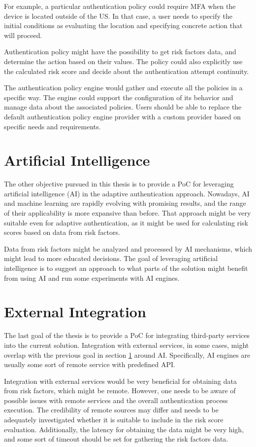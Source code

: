 For example, a particular authentication policy could require MFA when the device is located outside of the US.
In that case, a user needs to specify the initial conditions as evaluating the location and specifying concrete action that will proceed.

Authentication policy might have the possibility to get risk factors data, and determine the action based on their values.
The policy could also explicitly use the calculated risk score and decide about the authentication attempt continuity.

The authentication policy engine would gather and execute all the policies in a specific way.
The engine could support the configuration of its behavior and manage data about the associated policies.
Users should be able to replace the default authentication policy engine provider with a custom provider based on specific needs and requirements.

\section{Artificial Intelligence}\label{spec-ai}
The other objective pursued in this thesis is to provide a PoC for leveraging artificial intelligence (AI) in the adaptive authentication approach.
Nowadays, AI and machine learning are rapidly evolving with promising results, and the range of their applicability is more expansive than before.
That approach might be very suitable even for adaptive authentication, as it might be used for calculating risk scores based on data from risk factors.

Data from risk factors might be analyzed and processed by AI mechanisms, which might lead to more educated decisions.
The goal of leveraging artificial intelligence is to suggest an approach to what parts of the solution might benefit from using AI and run some experiments with AI engines.

\section{External Integration}
The last goal of the thesis is to provide a PoC for integrating third-party services into the current solution.
Integration with external services, in some cases, might overlap with the previous goal in section \ref{spec-ai} around AI.
Specifically, AI engines are usually some sort of remote service with predefined API. 

Integration with external services would be very beneficial for obtaining data from risk factors, which might be remote.
However, one needs to be aware of possible issues with remote services and the overall authentication process execution.
The credibility of remote sources may differ and needs to be adequately investigated whether it is suitable to include in the risk score evaluation.
Additionally, the latency for obtaining the data might be very high, and some sort of timeout should be set for gathering the risk factors data.

